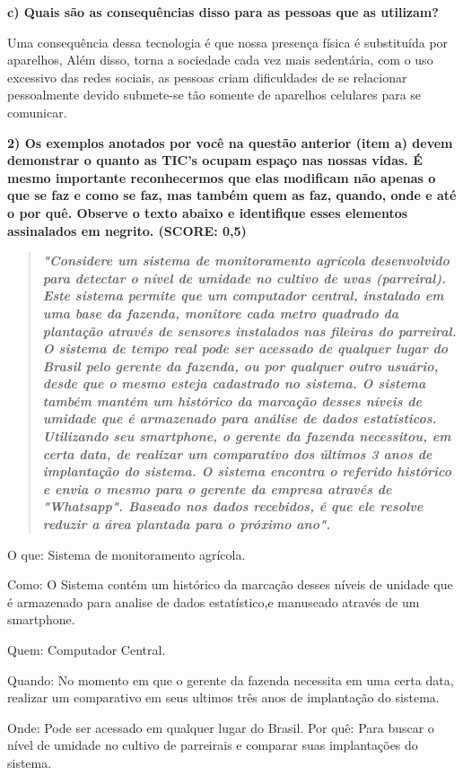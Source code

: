 \documentclass[
	article,			%
	11pt,				%
	oneside,			%
	a4paper,			%
	english,			%
	brazil,				%
	sumario=tradicional
	]{abntex2}
\begin{document}
\textbf{c) Quais são as consequências disso para as pessoas que as utilizam?}

Uma consequência dessa tecnologia é que nossa presença física é substituída por aparelhos, Além disso, torna a sociedade cada vez mais sedentária, com o uso excessivo das redes sociais, as pessoas criam dificuldades de se relacionar pessoalmente devido submete-se tão somente de aparelhos celulares para se comunicar. 

\textbf{2) Os exemplos anotados por você na questão anterior (item a) devem demonstrar o quanto as TIC's ocupam espaço nas nossas vidas. É mesmo importante reconhecermos que elas modificam não apenas o que se faz e como se faz, mas também quem as faz, quando, onde e até o por quê. Observe o texto abaixo e identifique esses elementos assinalados em negrito. (SCORE: 0,5)}

\begin{quotation}
	\textbf{\textit{"Considere um sistema de monitoramento agrícola desenvolvido para detectar o nível de umidade no cultivo de uvas (parreiral). Este sistema permite que um computador central, instalado em uma base da fazenda, monitore cada metro quadrado da plantação através de sensores instalados nas fileiras do parreiral. O sistema de tempo real pode ser acessado de qualquer lugar do Brasil pelo gerente da fazenda, ou por qualquer outro usuário, desde que o mesmo esteja cadastrado no sistema. O sistema também mantém um histórico da marcação desses níveis de umidade que é armazenado para análise de dados estatísticos. Utilizando seu smartphone, o gerente da fazenda necessitou, em certa data, de realizar um comparativo dos últimos 3 anos de implantação do sistema. O sistema encontra o referido histórico e envia o mesmo para o gerente da empresa através de "Whatsapp". Baseado nos dados recebidos, é que ele resolve reduzir a área plantada para o próximo ano".}}
\end{quotation}

O que: Sistema de monitoramento agrícola.

Como: O Sistema contém um histórico da marcação desses níveis de unidade que é armazenado para analise de dados estatístico,e manuseado através de um smartphone.

Quem: Computador Central.

Quando: No momento em que o gerente da fazenda necessita em uma certa data, realizar um comparativo em seus ultimos três anos de implantação do sistema.

Onde: Pode ser acessado em qualquer lugar do Brasil.
Por quê: Para buscar o nível de umidade no cultivo de parreirais e comparar suas implantações do sistema.
\end{document}
